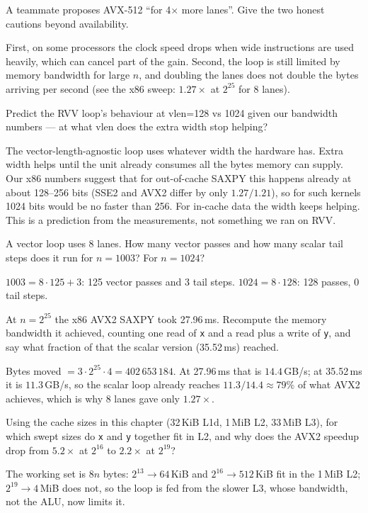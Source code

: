 \begin{exercise}[medium]
A teammate proposes AVX-512 ``for 4$\times$ more lanes''. Give
the two honest cautions beyond availability.
\end{exercise}
\begin{solution}
First, on some processors the clock speed drops when wide instructions
are used heavily, which can cancel part of the gain. Second, the loop is
still limited by memory bandwidth for large $n$, and doubling the lanes
does not double the bytes arriving per second (see the x86 sweep:
$1.27\times$ at $2^{25}$ for 8 lanes).
\end{solution}
\begin{exercise}[hard]
Predict the RVV loop's behaviour at vlen=128 vs 1024 given our
bandwidth numbers --- at what vlen does the extra width stop
helping?
\end{exercise}
\begin{solution}
The vector-length-agnostic loop uses whatever width the hardware has.
Extra width helps until the unit already consumes all the bytes memory
can supply. Our x86 numbers suggest that for out-of-cache SAXPY this
happens already at about 128--256 bits (SSE2 and AVX2 differ by only
$1.27/1.21$), so for such kernels 1024 bits would be no faster than 256.
For in-cache data the width keeps helping. This is a prediction from
the measurements, not something we ran on RVV.
\end{solution}

\begin{exercise}[easy]
A vector loop uses 8 lanes. How many vector passes and how many scalar
tail steps does it run for $n=1003$? For $n=1024$?
\end{exercise}
\begin{solution}
$1003=8\cdot125+3$: 125 vector passes and 3 tail steps. $1024=8\cdot128$:
128 passes, 0 tail steps.
\end{solution}
\begin{exercise}[medium]
At $n=2^{25}$ the x86 AVX2 SAXPY took 27.96\,ms. Recompute the memory
bandwidth it achieved, counting one read of \texttt{x} and a read plus
a write of \texttt{y}, and say what fraction of that the scalar
version (35.52\,ms) reached.
\end{exercise}
\begin{solution}
Bytes moved $=3\cdot 2^{25}\cdot 4=402\,653\,184$. At 27.96\,ms that is
$14.4$\,GB/s; at 35.52\,ms it is $11.3$\,GB/s, so the scalar loop
already reaches $11.3/14.4\approx 79\%$ of what AVX2 achieves,
which is why 8 lanes gave only $1.27\times$.
\end{solution}
\begin{exercise}[medium]
Using the cache sizes in this chapter (32\,KiB L1d, 1\,MiB L2, 33\,MiB L3),
for which swept sizes do \texttt{x} and \texttt{y} together fit in L2,
and why does the AVX2 speedup drop from $5.2\times$ at $2^{16}$ to
$2.2\times$ at $2^{19}$?
\end{exercise}
\begin{solution}
The working set is $8n$ bytes: $2^{13}\to 64$\,KiB and $2^{16}\to 512$\,KiB
fit in the 1\,MiB L2; $2^{19}\to 4$\,MiB does not, so the loop is
fed from the slower L3, whose bandwidth, not the ALU, now limits it.
\end{solution}
